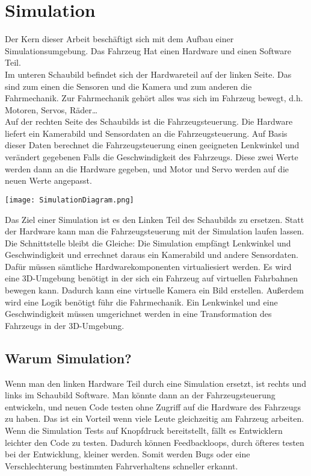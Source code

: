 \section{Simulation}
Der Kern dieser Arbeit beschäftigt sich mit dem Aufbau einer Simulationsumgebung.
Das Fahrzeug Hat einen Hardware und einen Software Teil. \\
Im unteren Schaubild befindet sich der Hardwareteil auf der linken Seite.
Das sind zum einen die Sensoren und die Kamera und zum anderen die Fahrmechanik.
Zur Fahrmechanik gehört alles was sich im Fahrzeug bewegt, d.h. Motoren, Servos, Räder\dots\\
Auf der rechten Seite des Schaubilds ist die Fahrzeugsteuerung.
Die Hardware liefert ein Kamerabild und Sensordaten an die Fahrzeugsteuerung.
Auf Basis dieser Daten berechnet die Fahrzeugsteuerung einen geeigneten Lenkwinkel und verändert gegebenen Falls die Geschwindigkeit des Fahrzeugs.
Diese zwei Werte werden dann an die Hardware gegeben, und Motor und Servo werden auf die neuen Werte angepasst.
\begin{center}
    \texttt{[image: SimulationDiagram.png]}
\end{center}
Das Ziel einer Simulation ist es den Linken Teil des Schaubilds zu ersetzen.
Statt der Hardware kann man die Fahrzeugsteuerung mit der Simulation laufen lassen.
Die Schnittstelle bleibt die Gleiche: Die Simulation empfängt Lenkwinkel und Geschwindigkeit und errechnet daraus ein Kamerabild und andere Sensordaten.
Dafür müssen sämtliche Hardwarekomponenten virtualiesiert werden. 
Es wird eine 3D-Umgebung benötigt in der sich ein Fahrzeug auf virtuellen Fahrbahnen bewegen kann.
Dadurch kann eine virtuelle Kamera ein Bild erstellen.
Außerdem wird eine Logik benötigt führ die Fahrmechanik. 
Ein Lenkwinkel und eine Geschwindigkeit müssen umgerichnet werden in eine Transformation des Fahrzeugs in der 3D-Umgebung.
\\
\subsection*{Warum Simulation?}
Wenn man den linken Hardware Teil durch eine Simulation ersetzt, ist rechts und links im Schaubild Software.
Man könnte dann an der Fahrzeugsteuerung entwickeln, und neuen Code testen ohne Zugriff auf die Hardware des Fahrzeugs zu haben.
Das ist ein Vorteil wenn viele Leute gleichzeitig am Fahrzeug arbeiten.
Wenn die Simulation Tests auf Knopfdruck bereitstellt, fällt es Entwicklern leichter den Code zu testen.
Dadurch können Feedbackloops, durch öfteres testen bei der Entwicklung, kleiner werden.
Somit werden Bugs oder eine Verschlechterung bestimmten Fahrverhaltens schneller erkannt.

